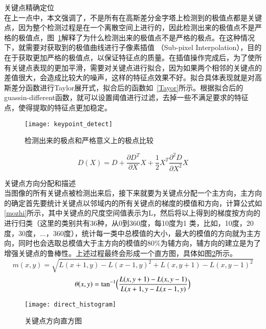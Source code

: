 \begin{compactenum}
\item 关键点精确定位\\在上一点中，本文强调了，不是所有在高斯差分金字塔上检测到的极值点都是关键点，因为整个检测过程是在一个离散空间上进行的，因此检测出来的极值点不是严格的极值点，图~\ref{fig:keypoint_detect}解释了为什么检测出来的极值点不是严格的极点。在这种情况下，就需要对获取到的极值曲线进行子像素插值 （Sub-pixel Interpolation），目的在于获取更加严格的极值点，以保证特征点的质量。在插值操作完成后，为了使所有关键点表现的更加平滑，需要对关键点进行拟合，因为如果两个相邻的关键点的差值很大，会造成比较大的噪声，这样的特征点效果不好。拟合具体表现就是对高斯差分函数进行Taylor展开式，拟合后的函数如~\ref{Tayor}所示。根据拟合后的guassin-different函数，就可以设置阈值进行过滤，去掉一些不满足要求的特征点，使得提取的特征点更加稳定。
\begin{figure}[htp]
\centering
\texttt{[image: keypoint\_detect]}
\caption{检测出来的极点和严格意义上的极点比较}
\label{fig:keypoint_detect}
\end{figure}


\begin{equation}\label{Tayor}
D(X)=D+\frac{\partial{D}^T}{\partial{X}}X+\frac{1}{2}X^T\frac{\partial^2{D}}{\partial{X}^2}X
\end{equation}

\item 关键点方向分配和描述\\当图像的所有关键点被检测出来后，接下来就要为关键点分配一个主方向，主方向的确定首先要统计关键点以邻域内的所有关键点的梯度的模值和方向，计算公式如\ref{mozhi}所示，其中关键点的尺度空间值表示为L，然后将以上得到的梯度按方向的进行归类（这里的类别共有36种，从0到360度，每10度为1 类，比如，10度，20度，30度，...，360度），统计每一类中总模值的大小，最大的模值的方向就为主方向，同时也会选取总模值大于主方向的模值的80\%为辅方向，辅方向的建立是为了增强关键点的鲁棒性。上述过程最终会形成一个直方图，具体如图\ref{fig:direct_histogram}所示。
\begin{equation}\label{mozhi}
m(x,y)=\sqrt{L(x+1,y)-{L(x-1,y)}^2+L(x,y+1)-{L(x,y-1)}^2}
\end{equation}
\begin{equation}\label{fangxiang}
\theta(x,y)=\tan^{-1}\Bigl({\frac{L(x,y+1)-L(x,y-1)}{L(x+1,y-L(x-1,y)}}\Bigr)
\end{equation}
\end{compactenum}

\begin{figure}[htp]
\centering
\texttt{[image: direct\_histogram]}
\caption{关键点方向直方图}
\label{fig:direct_histogram}
\end{figure}

